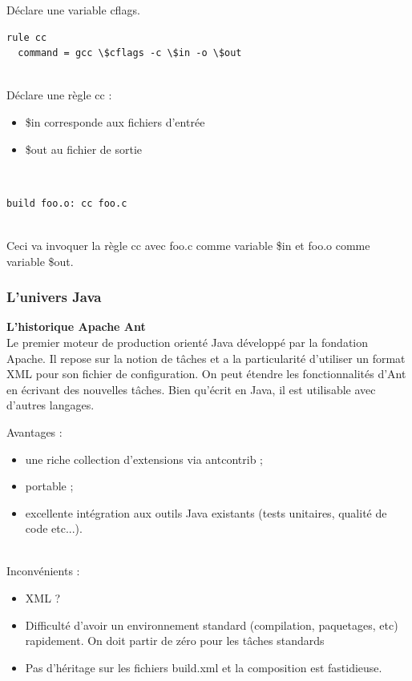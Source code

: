 \documentclass[11pt,twoside,a4paper]{article}
\begin{document}
D{\'e}clare une variable cflags.
		\begin{verbatim}
rule cc
  command = gcc \$cflags -c \$in -o \$out
 		\end{verbatim}~\\

D{\'e}clare une r{\`e}gle cc :
\begin{itemize}
	\item \$in corresponde aux fichiers d'entr{\'e}e
    \item \$out au fichier de sortie
\end{itemize}~\\

		\begin{verbatim}
build foo.o: cc foo.c
 		\end{verbatim}~\\

Ceci va invoquer la r{\`e}gle cc avec foo.c comme variable \$in et foo.o comme variable \$out.

\subsubsection{L'univers Java}
\textbf{L'historique Apache Ant}~\\

Le premier moteur de production orient{\'e} Java d{\'e}velopp{\'e} par la fondation Apache. Il repose sur la notion de t{\^a}ches et a la particularit{\'e} d'utiliser un format XML pour son fichier de configuration. On peut {\'e}tendre les fonctionnalit{\'e}s d'Ant en {\'e}crivant des nouvelles t{\^a}ches.
Bien qu'{\'e}crit en Java, il est utilisable avec d'autres langages.

Avantages :
\begin{itemize}
	\item une riche collection d'extensions via antcontrib ;
	\item portable ;
	\item excellente int{\'e}gration aux outils Java existants (tests unitaires, qualit{\'e} de code etc...).
\end{itemize}~\\

Inconv{\'e}nients :
\begin{itemize}
	\item XML ?
	\item Difficult{\'e} d'avoir un environnement standard (compilation, paquetages, etc) rapidement. On doit partir de z{\'e}ro pour les t{\^a}ches standards
	\item Pas d'h{\'e}ritage sur les fichiers build.xml et la composition est fastidieuse.
\end{itemize}~\\
\end{document}
